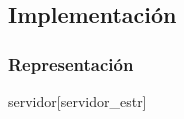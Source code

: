 \subsection{Implementación}
\subsubsection*{Representación}
\begin{Estructura}{servidor}[servidor\_estr]
\begin{Tupla}
\begin{adjustwidth}{3em}{}\ \
  \\
  \\
  \\

  \falta
\end{adjustwidth}\ \ \ \ \ \ \
\end{Tupla}
\end{Estructura}
\newpage


